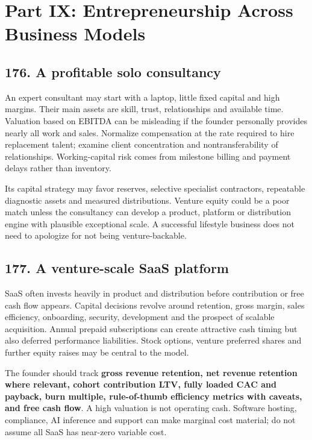 \section{Part IX: Entrepreneurship Across Business Models}

\subsection{176. A profitable solo consultancy}


An expert consultant may start with a laptop, little fixed capital and high margins. Their main assets are skill, trust, relationships and available time. Valuation based on EBITDA can be misleading if the founder personally provides nearly all work and sales. Normalize compensation at the rate required to hire replacement talent; examine client concentration and nontransferability of relationships. Working-capital risk comes from milestone billing and payment delays rather than inventory.

Its capital strategy may favor reserves, selective specialist contractors, repeatable diagnostic assets and measured distributions. Venture equity could be a poor match unless the consultancy can develop a product, platform or distribution engine with plausible exceptional scale. A successful lifestyle business does not need to apologize for not being venture-backable.

\subsection{177. A venture-scale SaaS platform}


SaaS often invests heavily in product and distribution before contribution or free cash flow appears. Capital decisions revolve around retention, gross margin, sales efficiency, onboarding, security, development and the prospect of scalable acquisition. Annual prepaid subscriptions can create attractive cash timing but also deferred performance liabilities. Stock options, venture preferred shares and further equity raises may be central to the model.

The founder should track \textbf{gross revenue retention, net revenue retention where relevant, cohort contribution LTV, fully loaded CAC and payback, burn multiple, rule-of-thumb efficiency metrics with caveats, and free cash flow}. A high valuation is not operating cash. Software hosting, compliance, AI inference and support can make marginal cost material; do not assume all SaaS has near-zero variable cost.

